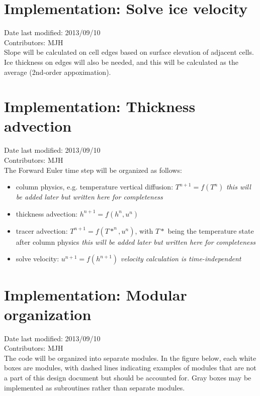\documentclass[11pt]{report}
\begin{document}
\section{Implementation: Solve ice velocity}
Date last modified: 2013/09/10 \\
Contributors: MJH \\

Slope will be calculated on cell edges based on surface elevation of adjacent cells.  Ice thickness on edges will also be needed, and this will be calculated as the average (2nd-order appoximation).

\section{Implementation: Thickness advection}
Date last modified: 2013/09/10 \\
Contributors: MJH \\

The Forward Euler time step will be organized as follows:

\begin{itemize}
\item column physics, e.g. temperature vertical diffusion: $T^{n+1} = f(T^n)$  \emph{this will be added later but written here for completeness}
\item thickness advection: $h^{n+1} = f(h^n, u^n)$
\item tracer advection: $T^{n+1} = f(T*^n, u^n)$, with $T*$ being the temperature state after column physics  \emph{this will be added later but written here for completeness}
\item solve velocity: $u^{n+1} = f(h^{n+1})$  \emph{velocity calculation is time-independent}
\end{itemize}




\section{Implementation: Modular organization}
Date last modified: 2013/09/10 \\
Contributors: MJH \\

The code will be organized into separate modules.  In the figure below, each white boxes are modules, with dashed lines indicating examples of modules that are not a part of this design document but should be accounted for.  Gray boxes may be implemented as subroutines rather than separate modules.
\end{document}
